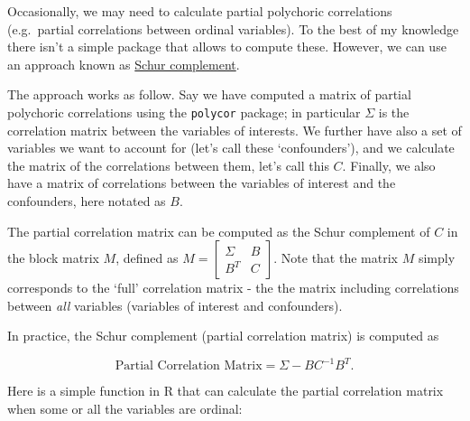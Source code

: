 \documentclass[
]{book}
\begin{document}
Occasionally, we may need to calculate partial polychoric correlations (e.g.~partial correlations between ordinal variables). To the best of my knowledge there isn't a simple package that allows to compute these. However, we can use an approach known as \href{https://en.wikipedia.org/wiki/Schur_complement}{Schur complement}.

The approach works as follow. Say we have computed a matrix of partial polychoric correlations using the \texttt{polycor} package; in particular \(\Sigma\) is the correlation matrix between the variables of interests. We further have also a set of variables we want to account for (let's call these `confounders'), and we calculate the matrix of the correlations between them, let's call this \(C\). Finally, we also have a matrix of correlations between the variables of interest and the confounders, here notated as \(B\).

The partial correlation matrix can be computed as the Schur complement of \(C\) in the block matrix \(M\), defined as \(M = \begin{bmatrix} \Sigma & B \\ B^T & C \end{bmatrix}\). Note that the matrix \(M\) simply corresponds to the `full' correlation matrix - the the matrix including correlations between \emph{all} variables (variables of interest and confounders).

In practice, the Schur complement (partial correlation matrix) is computed as

\[\text{Partial Correlation Matrix} = \Sigma - BC^{-1}B^T.\]

Here is a simple function in R that can calculate the partial correlation matrix when some or all the variables are ordinal:
\end{document}
